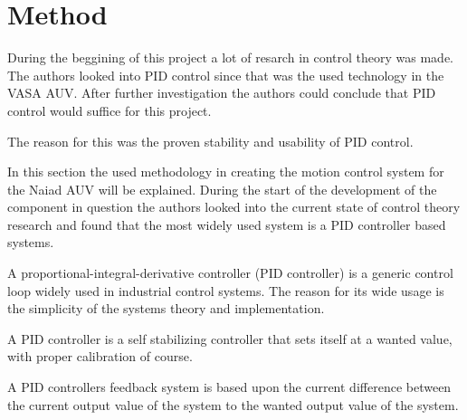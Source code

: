 \section{Method}\label{sec:method}

During the beggining of this project a lot of resarch in control theory was made. The authors looked into PID control since that was the used technology in the VASA AUV. After further investigation the authors could conclude that PID control would suffice for this project.

The reason for this was the proven stability and usability of PID control.

In this section the used methodology in creating the motion control system for the Naiad AUV will be explained. During the start of the development of the component in question the authors looked into the current state of control theory research and found that the most widely used system is a PID controller based systems.

A proportional-integral-derivative controller (PID controller) is a generic control loop widely used in industrial control systems. The reason for its wide usage is the simplicity of the systems theory and implementation.

A PID controller is a self stabilizing controller that sets itself at a wanted value, with proper calibration of course. 

A PID controllers feedback system is based upon the current difference between the current output value of the system to the wanted output value of the system. 








